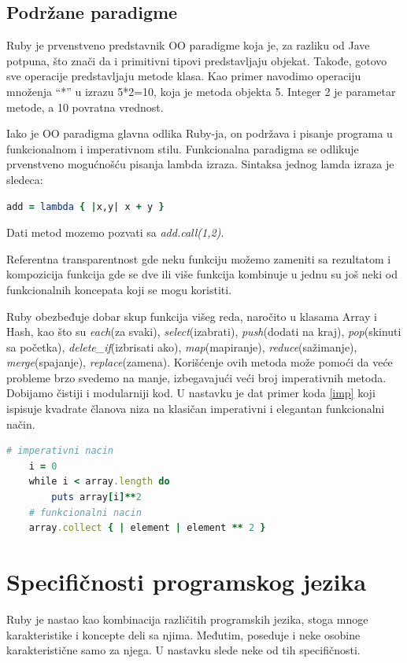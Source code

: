 \documentclass[a4paper]{article}
\begin{document}
\subsection{Podržane paradigme}
Ruby je prvenstveno predstavnik OO paradigme koja je, za razliku od Jave potpuna, što znači da i primitivni tipovi predstavljaju objekat. Takođe, gotovo sve operacije predstavljaju metode klasa. Kao primer navodimo operaciju množenja “*” u izrazu 5*2=10, koja je metoda objekta 5. Integer 2 je parametar metode, a 10 povratna vrednost.

Iako je OO paradigma glavna odlika Ruby-ja, on podržava i pisanje programa u funkcionalnom i imperativnom stilu. Funkcionalna paradigma se odlikuje prvenstveno mogućnošću pisanja lambda izraza. Sintaksa jednog lamda izraza je sledeca:
\begin{lstlisting}[language=Ruby]
	add = lambda { |x,y| x + y }
\end{lstlisting}\vspace*{-15pt}
Dati metod mozemo pozvati sa \emph{add.call(1,2)}.

Referentna transparentnost gde neku funkciju možemo zameniti sa rezultatom i kompozicija funkcija gde se dve ili više funkcija kombinuje u jednu su još neki od funkcionalnih koncepata koji se mogu koristiti.

Ruby obezbeđuje dobar skup funkcija višeg reda, naročito u klasama Array i Hash, kao što su \emph{each}(za svaki), \emph{select}(izabrati), \emph{push}(dodati na kraj), \emph{pop}(skinuti sa početka), \emph{delete\_if}(izbrisati ako), \emph{map}(mapiranje), \emph{reduce}(sažimanje), \emph{merge}(spajanje), \emph{replace}(zamena). Korišćenje ovih metoda može pomoći da veće probleme brzo svedemo na manje, izbegavajući veći broj imperativnih metoda. Dobijamo čistiji i modularniji kod. U nastavku je dat primer koda \ref{imp} koji ispisuje kvadrate članova niza na klasičan imperativni i elegantan funkcionalni način.
\begin{lstlisting}[language=Ruby, caption={Primer koda}, frame=single, label=imp]
	# imperativni nacin
	i = 0
	while i < array.length do 				
		puts array[i]**2	
	# funkcionalni nacin
	array.collect { | element | element ** 2 }	
\end{lstlisting}\vspace*{-15pt}
\section{Specifičnosti programskog jezika}
Ruby je nastao kao kombinacija različitih programskih jezika, stoga mnoge karakteristike i koncepte deli sa njima. Međutim, poseduje i neke osobine karakteristične samo za njega. U nastavku slede neke od tih specifičnosti.
\end{document}
